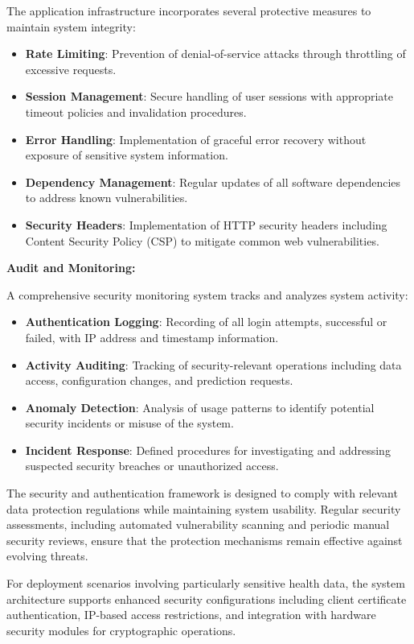 \documentclass[12pt,a4paper]{report}
\begin{document}
The application infrastructure incorporates several protective measures to maintain system integrity:

\begin{itemize}
    \item \textbf{Rate Limiting}: Prevention of denial-of-service attacks through throttling of excessive requests.
    \item \textbf{Session Management}: Secure handling of user sessions with appropriate timeout policies and invalidation procedures.
    \item \textbf{Error Handling}: Implementation of graceful error recovery without exposure of sensitive system information.
    \item \textbf{Dependency Management}: Regular updates of all software dependencies to address known vulnerabilities.
    \item \textbf{Security Headers}: Implementation of HTTP security headers including Content Security Policy (CSP) to mitigate common web vulnerabilities.
\end{itemize}

\textbf{Audit and Monitoring:}

A comprehensive security monitoring system tracks and analyzes system activity:

\begin{itemize}
    \item \textbf{Authentication Logging}: Recording of all login attempts, successful or failed, with IP address and timestamp information.
    \item \textbf{Activity Auditing}: Tracking of security-relevant operations including data access, configuration changes, and prediction requests.
    \item \textbf{Anomaly Detection}: Analysis of usage patterns to identify potential security incidents or misuse of the system.
    \item \textbf{Incident Response}: Defined procedures for investigating and addressing suspected security breaches or unauthorized access.
\end{itemize}

The security and authentication framework is designed to comply with relevant data protection regulations while maintaining system usability. Regular security assessments, including automated vulnerability scanning and periodic manual security reviews, ensure that the protection mechanisms remain effective against evolving threats.

For deployment scenarios involving particularly sensitive health data, the system architecture supports enhanced security configurations including client certificate authentication, IP-based access restrictions, and integration with hardware security modules for cryptographic operations.
\end{document}
